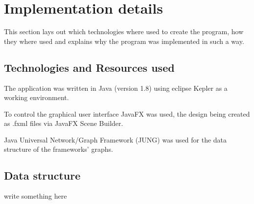 \documentclass[draft,final]{vutinfth} %
\newcommand{\hl}{\par\vspace{6pt}} %
\newcommand{\cl}{\par\vspace{12pt}} %
\begin{document}
\section{Implementation details}
This section lays out which technologies where used to create the program, how they where used and explains why the program was implemented in such a way.\cl %

\subsection{Technologies and Resources used}
The application was written in Java (version 1.8) using eclipse Kepler as a working environment.\hl
To control the graphical user interface JavaFX was used, the design being created as .fxml files via JavaFX Scene Builder.\hl
Java Universal Network/Graph Framework (JUNG) was used for the data structure of the frameworks' graphs.

\subsection{Data structure}
write something here



\backmatter

%
%
\printbibliography


\end{document}
